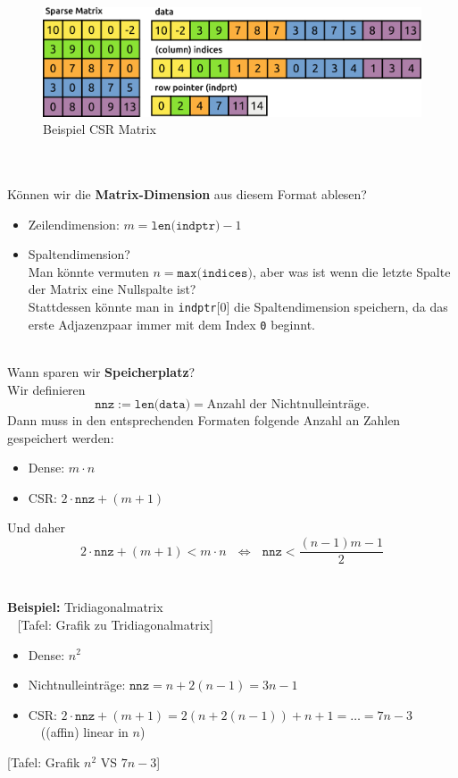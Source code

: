 \begin{figure}[h!]
	\centering
	\includegraphics[width=0.7\linewidth]{media/csr-matrix}
	\caption{Beispiel CSR Matrix}
	\label{fig:csr-matrix}
\end{figure}
~\\~\\
Können wir die \textbf{Matrix-Dimension} aus diesem Format ablesen?
\begin{itemize}
	\item Zeilendimension: $m = \texttt{len(indptr)} - 1$
	\item Spaltendimension?\\
			Man könnte vermuten $n=\texttt{max(indices)}$, aber was ist wenn die letzte Spalte der Matrix eine Nullspalte ist?\\
			Stattdessen könnte man in \texttt{indptr}[0] die Spaltendimension speichern, da das erste Adjazenzpaar immer mit dem Index \texttt{0} beginnt.
\end{itemize}
~\\
Wann sparen wir \textbf{Speicherplatz}?\\
Wir definieren $$\texttt{nnz} := \texttt{len(data)} = \text{Anzahl der Nichtnulleinträge}.$$ 
Dann muss in den entsprechenden Formaten folgende Anzahl an Zahlen gespeichert werden:
\begin{itemize}
	\item Dense: $m\cdot n$
	\item CSR: $2 \cdot \texttt{nnz} + (m+1)$
\end{itemize}
Und daher 
$$2 \cdot \texttt{nnz} + (m+1) < m\cdot n ~~~\Leftrightarrow~~~ \texttt{nnz} < \frac{(n-1)m - 1}{2}$$
~\\~\\
\textbf{Beispiel:} Tridiagonalmatrix\\~
[Tafel: Grafik zu Tridiagonalmatrix]
\begin{itemize}
	\item Dense: $n^2$
	\item Nichtnulleinträge: $\texttt{nnz} = n + 2 (n-1) = 3n -1$
	\item CSR: $2 \cdot \texttt{nnz} + (m+1) = 2 (n + 2 (n-1)) + n+1 = \ldots = 7n -3$ ~~((affin) linear in $n$)
\end{itemize}
[Tafel: Grafik $n^2$ VS $7n -3$]

